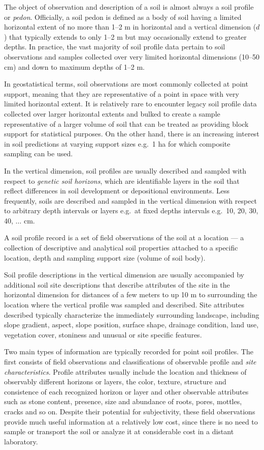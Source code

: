 \documentclass[graybox,natbib,nospthms,UStrade]{svmono}
\let\BeginKnitrBlock\begin \let\EndKnitrBlock\end
\let\BeginKnitrBlock\begin \let\EndKnitrBlock\end
\begin{document}
The object of observation and description of a soil is almost always a
soil profile or \emph{pedon}. Officially, a soil pedon is defined as a body
of soil having a limited horizontal extent of no more than 1--2 m in
horizontal and a vertical dimension (\(d\)) that typically extends to only
1--2 m but may occasionally extend to greater depths. In practice, the vast
majority of soil profile data pertain to soil observations and samples
collected over very limited horizontal dimensions (10--50 cm) and down to
maximum depths of 1--2 m.

In geostatistical terms, soil observations are most commonly collected at
point support, meaning that they are representative of a point in space
with very limited horizontal extent. It is relatively rare to encounter
legacy soil profile data collected over larger horizontal extents and
bulked to create a sample representative of a larger volume of soil that
can be treated as providing block support for statistical purposes. On
the other hand, there is an increasing interest in soil predictions at
varying support sizes e.g.~1 ha for which composite sampling can be used.

In the vertical dimension, soil profiles are usually described and
sampled with respect to \emph{genetic soil horizons}, which are identifiable
layers in the soil that reflect differences in soil development or
depositional environments. Less frequently, soils are described and
sampled in the vertical dimension with respect to arbitrary depth
intervals or layers e.g.~at fixed depths intervals e.g.~10, 20, 30, 40,
\(\ldots\) cm.

\BeginKnitrBlock{rmdnote}
A soil profile record is a set of field
observations of the soil at a location --- a collection of descriptive and
analytical soil properties attached to a specific location, depth and
sampling support size (volume of soil body).
\EndKnitrBlock{rmdnote}

Soil profile descriptions in the vertical dimension are usually
accompanied by additional soil site descriptions that describe
attributes of the site in the horizontal dimension for distances of a
few meters to up 10 m to surrounding the location where the vertical profile
was sampled and described. Site attributes described typically
characterize the immediately surrounding landscape, including slope
gradient, aspect, slope position, surface shape, drainage condition,
land use, vegetation cover, stoniness and unusual or site specific
features.

Two main types of information are typically recorded for point soil
profiles. The first consists of field observations and classifications
of observable profile and \emph{site characteristics}. Profile attributes
usually include the location and thickness of observably different
horizons or layers, the color, texture, structure and consistence of
each recognized horizon or layer and other observable attributes such as
stone content, presence, size and abundance of roots, pores, mottles,
cracks and so on. Despite their potential for subjectivity, these field
observations provide much useful information at a relatively low cost,
since there is no need to sample or transport the soil or analyze it at
considerable cost in a distant laboratory.
\end{document}
